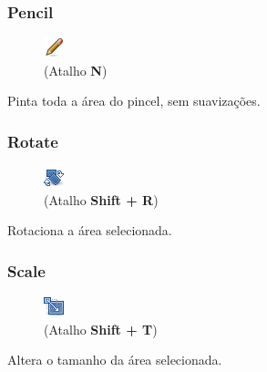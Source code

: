\documentclass[12pt,onecolumn]{article}
\begin{document}
    \subsubsection{Pencil}
    \begin{figure}
      \vspace{-50pt}
      \begin{center}
        \includegraphics{gimp-icons/stock-tool-pencil-22.png} \\
        (Atalho {\bf N})
      \end{center}
      \label{fig:pencil}
      \vspace{-20pt}
    \end{figure}
    Pinta toda a área do pincel, sem suavizações.
    
    \subsubsection{Rotate}
    \begin{figure}
      \vspace{-50pt}
      \begin{center}
        \includegraphics{gimp-icons/stock-tool-rotate-22.png} \\
        (Atalho {\bf Shift + R})
      \end{center}
      \label{fig:rotate}
      \vspace{-20pt}
    \end{figure}
    Rotaciona a área selecionada.
    
    \subsubsection{Scale}
    \begin{figure}
      \vspace{-50pt}
      \begin{center}
        \includegraphics{gimp-icons/stock-tool-scale-22.png} \\
        (Atalho {\bf Shift + T})
      \end{center}
      \label{fig:scale}
      \vspace{-20pt}
    \end{figure}
    Altera o tamanho da área selecionada.
    
\end{document}

